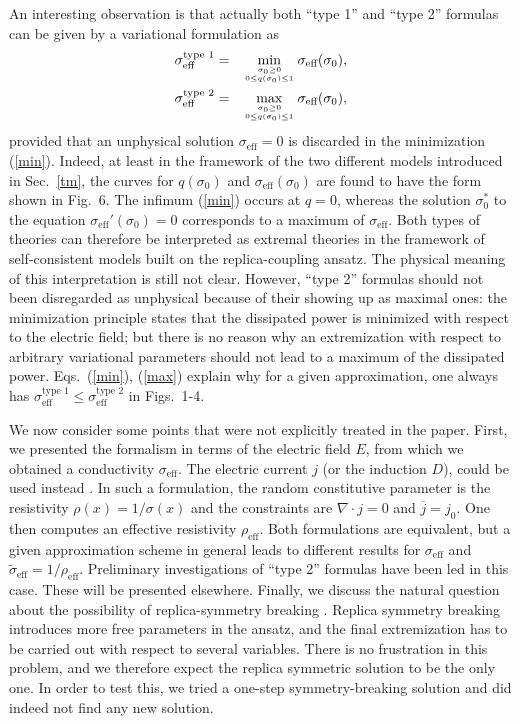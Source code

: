 An interesting observation is that actually both ``type 1'' 
and ``type 2'' formulas can be given by a variational formulation as
\begin{eqnarray}
\label{min}
\sigma_{\text{eff}}^{\text{type 1}}&=& \min_{\sigma_0\geq 0\atop 0\leq
q(\sigma_0)\leq 1}\sigma_{\text{eff}}(\sigma_0),\\
\label{max}
\sigma_{\text{eff}}^{\text{type 2}}&=&
\max_{\sigma_0\geq 0\atop 0\leq q(\sigma_0)\leq 1}
\sigma_{\text{eff}}(\sigma_0),
\end{eqnarray}
provided that an unphysical solution $\sigma_{\text{eff}}=0$ is
discarded in the minimization (\ref{min}). Indeed, at least in the
framework of the two different models introduced in Sec.\ \ref{tm},
the curves for $q(\sigma_0)$ and $\sigma_{\text{eff}}(\sigma_0)$ are
found to have the form shown in Fig.\ 6. The infimum (\ref{min})
occurs at $q=0$, whereas the solution $\sigma_0^*$ to the equation
$\sigma_{\text{eff}}'(\sigma_0)=0$ corresponds to a maximum of
$\sigma_{\text{eff}}$. Both types of theories can therefore be
interpreted as extremal theories in the framework of self-consistent
models built on the replica-coupling ansatz.  The physical meaning of
this interpretation is still not clear. However, ``type 2''
formulas should not been disregarded as unphysical because of their
showing up as maximal ones: the minimization principle states that the
dissipated power is minimized with respect to the electric field; but
there is no reason why an extremization with respect to arbitrary
variational parameters should not lead to a maximum of the dissipated
power.  Eqs.\ (\ref{min}), (\ref{max}) explain why for a given
approximation, one always has $\sigma_{\text{eff}}^{\text{type 1}}
\leq\sigma_{\text{eff}}^{\text{type 2}}$ in Figs.\ 1-4.
 
We now consider some points that were not explicitly treated in the
paper. First, we presented the formalism in terms of the electric
field $E$, from which we obtained a conductivity
$\sigma_{\text{eff}}$. The electric current $j$ (or the induction
$D$), could be used instead \cite{BART98}. In such a formulation, the
random constitutive parameter is the resistivity $\rho(x)=1/\sigma(x)$
and the constraints are $\nabla\cdot j=0$ and $\overline{j}=j_0$. One
then computes an effective resistivity $\rho_{\text{eff}}$. Both
formulations are equivalent, but a given approximation scheme in
general leads to different results for $\sigma_{\text{eff}}$ and
$\tilde\sigma_{\text{eff}}=1/\rho_{\text{eff}}$.  Preliminary
investigations of ``type 2'' formulas have been led in this
case. These will be presented elsewhere.  Finally, we discuss the
natural question about the possibility of replica-symmetry breaking
\cite{PARI84}. Replica symmetry breaking introduces more free
parameters in the ansatz, and the final extremization has to be
carried out with respect to several variables. There is no frustration
in this problem, and we therefore expect the replica symmetric
solution to be the only one. In order to test this, we tried a one-step
symmetry-breaking solution and did indeed not find any new solution.

